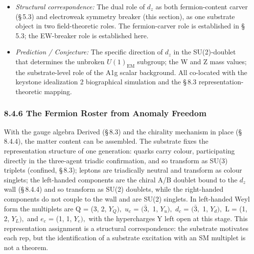 \documentclass[11pt,oneside]{report}
\theoremstyle{definition}
\theoremstyle{remark}
\begin{document}
\begin{itemize}
\item
  \emph{Structural correspondence:} The dual role of \ensuremath{d_{z}} as both
  fermion-content carver (\S\,5.3) and electroweak symmetry breaker (this
  section), as one substrate object in two field-theoretic roles. The
  fermion-carver role is established in \S\,5.3; the EW-breaker role is
  established here.
\end{itemize}

\begin{itemize}
\item
  \emph{Prediction / Conjecture:} The specific direction of \ensuremath{d_{z}} in the
  SU(2)-doublet that determines the unbroken \ensuremath{U(1)_{\mathrm{EM}}} subgroup; the W
  and Z mass values; the substrate-level role of the A1g scalar
  background. All co-located with the keystone idealization 2
  biographical simulation and the \S\,8.3 representation-theoretic mapping.
\end{itemize}

\subsubsection*{8.4.6 The Fermion Roster from Anomaly Freedom}

With the gauge algebra Derived (\S\,8.3) and the chirality mechanism in
place (\S\,8.4.4), the matter content can be assembled. The substrate fixes
the representation structure of one generation: quarks carry colour,
participating directly in the three-agent triadic confirmation, and so
transform as SU(3) triplets (confined, \S\,8.3); leptons are triadically
neutral and transform as colour singlets; the left-handed components are
the chiral A/B doublet bound to the \ensuremath{d_{z}} wall (\S\,8.4.4) and so transform
as SU(2) doublets, while the right-handed components do not couple to
the wall and are SU(2) singlets. In left-handed Weyl form the multiplets
are Q = (3, 2, \ensuremath{Y_{Q}),} \ensuremath{u_{c}} = \ensuremath{(\bar{3},} 1, \ensuremath{Y_{u}),} \ensuremath{d_{c}} = \ensuremath{(\bar{3},} 1, \ensuremath{Y_{d}),} L = (1, 2,
\ensuremath{Y_{L}),} and \ensuremath{e_{c}} = (1, 1, \ensuremath{Y_{e}),} with the hypercharges Y left open at this
stage. This representation assignment is a structural correspondence:
the substrate motivates each rep, but the identification of a substrate
excitation with an SM multiplet is not a theorem.
\end{document}
